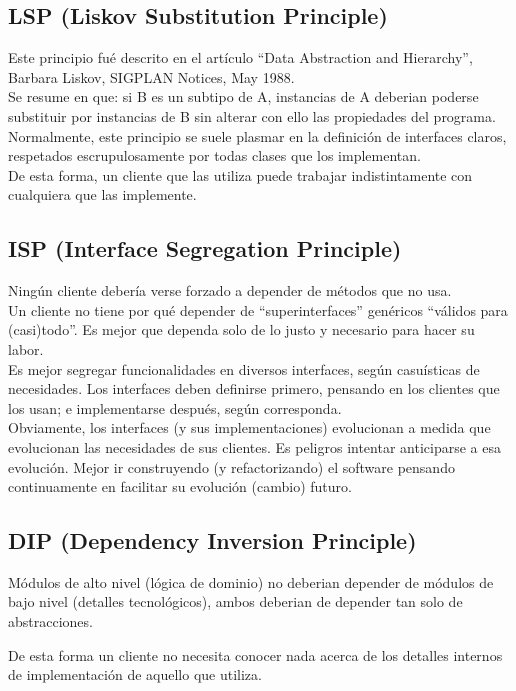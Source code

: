 \documentclass[spanish,12pt,a4paper,final,oneside]{book}
\begin{document}
\subsection{\textbf{L}SP (Liskov Substitution Principle)}
Este principio fué descrito en el artículo ``Data Abstraction and Hierarchy'', Barbara Liskov, SIGPLAN Notices, May 1988.
\\Se resume en que: si B es un subtipo de A, instancias de A deberian poderse substituir por instancias de B sin alterar con ello las propiedades del programa.
\\Normalmente, este principio se suele plasmar en la definición de interfaces claros, respetados escrupulosamente por todas clases que los implementan.
\\De esta forma, un cliente que las utiliza puede trabajar indistintamente con cualquiera que las implemente.

\subsection{\textbf{I}SP (Interface Segregation Principle)}
Ningún cliente debería verse forzado a depender de métodos que no usa.
\\Un cliente no tiene por qué depender de ``superinterfaces'' genéricos ``válidos para (casi)todo''. Es mejor que dependa solo de lo justo y necesario para hacer su labor.
\\Es mejor segregar funcionalidades en diversos interfaces, según casuísticas de necesidades. Los interfaces deben definirse primero, pensando en los clientes que los usan; e implementarse después, según corresponda.
\\Obviamente, los interfaces (y sus implementaciones) evolucionan a medida que evolucionan las necesidades de sus clientes. Es peligros intentar anticiparse a esa evolución. Mejor ir construyendo (y refactorizando) el software pensando continuamente en facilitar su evolución (cambio) futuro.
\subsection{\textbf{D}IP (Dependency Inversion Principle)}
Módulos de alto nivel (lógica de dominio) no deberian depender de módulos de bajo nivel (detalles tecnológicos), ambos deberian de depender tan solo de abstracciones.

De esta forma un cliente no necesita conocer nada acerca de los detalles internos de implementación de aquello que utiliza.
\end{document}
